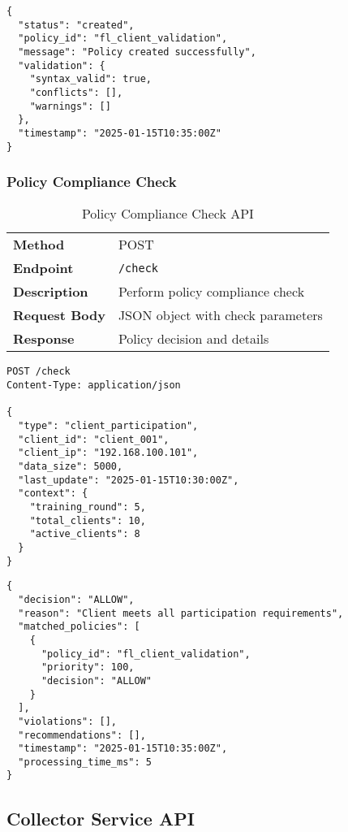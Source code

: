 \begin{lstlisting}[style=jsoncode, caption=Create Policy Response]
{
  "status": "created",
  "policy_id": "fl_client_validation",
  "message": "Policy created successfully",
  "validation": {
    "syntax_valid": true,
    "conflicts": [],
    "warnings": []
  },
  "timestamp": "2025-01-15T10:35:00Z"
}
\end{lstlisting}

\subsubsection{Policy Compliance Check}

\begin{table}[H]
\centering
\caption{Policy Compliance Check API}
\label{tab:policy-check-api}
\begin{tabularx}{\textwidth}{@{}lX@{}}
\toprule
\textbf{Method} & POST \\
\textbf{Endpoint} & \texttt{/check} \\
\textbf{Description} & Perform policy compliance check \\
\textbf{Request Body} & JSON object with check parameters \\
\textbf{Response} & Policy decision and details \\
\bottomrule
\end{tabularx}
\end{table}

\begin{lstlisting}[style=jsoncode, caption=Policy Check Request]
POST /check
Content-Type: application/json

{
  "type": "client_participation",
  "client_id": "client_001",
  "client_ip": "192.168.100.101",
  "data_size": 5000,
  "last_update": "2025-01-15T10:30:00Z",
  "context": {
    "training_round": 5,
    "total_clients": 10,
    "active_clients": 8
  }
}
\end{lstlisting}

\begin{lstlisting}[style=jsoncode, caption=Policy Check Response]
{
  "decision": "ALLOW",
  "reason": "Client meets all participation requirements",
  "matched_policies": [
    {
      "policy_id": "fl_client_validation",
      "priority": 100,
      "decision": "ALLOW"
    }
  ],
  "violations": [],
  "recommendations": [],
  "timestamp": "2025-01-15T10:35:00Z",
  "processing_time_ms": 5
}
\end{lstlisting}

\subsection{Collector Service API}

